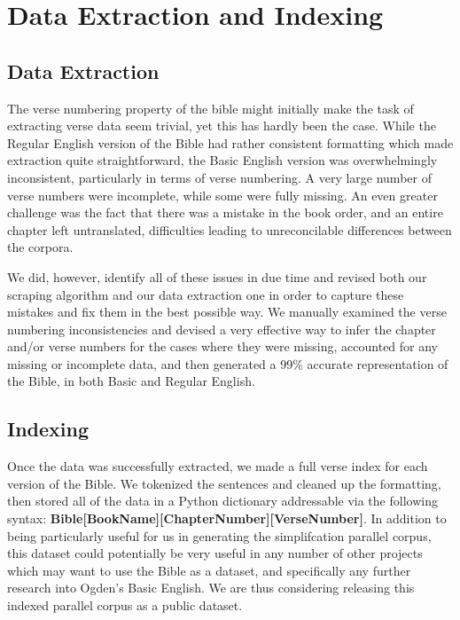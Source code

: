 \documentclass[11pt]{article}
\begin{document}
\section{Data Extraction and Indexing}

\subsection{Data Extraction}

The verse numbering property of the bible might initially make the task of extracting verse data seem trivial, yet this has hardly been the case. While the Regular English version of the Bible had rather consistent formatting which made extraction quite straightforward, the Basic English version was overwhelmingly inconsistent, particularly in terms of verse numbering. A very large number of verse numbers were incomplete, while some were fully missing. An even greater challenge was the fact that there was a mistake in the book order, and an entire chapter left untranslated, difficulties leading to unreconcilable differences between the corpora.

We did, however, identify all of these issues in due time and revised both our scraping algorithm and our data extraction one in order to capture these mistakes and fix them in the best possible way. We manually examined the verse numbering inconsistencies and devised a very effective way to infer the chapter and/or verse numbers for the cases where they were missing, accounted for any missing or incomplete data, and then generated a 99\% accurate representation of the Bible, in both Basic and Regular English.

\subsection{Indexing}

Once the data was successfully extracted, we made a full verse index for each version of the Bible. We tokenized the sentences and cleaned up the formatting, then stored all of the data in a Python dictionary addressable via the following syntax: {\small\bf Bible[BookName][ChapterNumber][VerseNumber]}. In addition to being particularly useful for us in generating the simplifcation parallel corpus, this dataset could potentially be very useful in any number of other projects which may want to use the Bible as a dataset, and specifically any further research into Ogden's Basic English. We are thus considering releasing this indexed parallel corpus as a public dataset.
\end{document}
